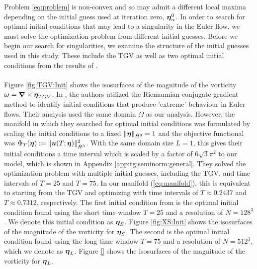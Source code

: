 Problem \ref{eq:problem} is non-convex and so may admit a different local maxima depending on the initial guess used at iteration zero, ${\boldsymbol \eta_\alpha^0}$. In order to search for optimal initial conditions that may lead to a singularity in the Euler flow, we must solve the optimization problem from different initial guesses. Before we begin our search for singularities, we examine the structure of the initial guesses used in this study. These include the TGV as well as two optimal initial conditions from the results of \cite{zhao_systematic_2023}.
\\~\\
Figure \ref{fig:TGV:Init} shows the isosurfaces of the magnitude of the vorticity {\color{red}$\boldsymbol \omega = {\boldsymbol \nabla}\times{\boldsymbol \eta}_{TGV}$. In \cite{zhao_systematic_2023}, the authors utilized the Riemannian conjugate gradient method to identify initial conditions that produce 'extreme' behaviour in Euler flows. Their analysis used the same domain $\Omega$ as our analysis. However, the manifold in which they searched for optimal initial conditions was formulated by scaling the initial conditions to a fixed $\|{\boldsymbol \eta}\|_{\dot{H}^3} = 1$ and the objective functional was $\Phi_T({\boldsymbol \eta}) := \|\boldsymbol u(T;{\boldsymbol \eta})\|_{\dot{H}^3}^2$. With the same domain size $L=1$, this gives their initial conditions a time interval which is scaled by a factor of $6\sqrt{3}\pi^2$ to our model, which is shown in Appendix \ref{app:tg:seminorm:general}. They solved the optimization problem with multiple initial guesses, including the TGV, and time intervals of $T=25$ and $T=75$. In our manifold (\ref{eq:manifold}), this is equivalent to starting from the TGV and optimizing with time intervals of $T\approx 0.2437$ and $T\approx 0.7312$, respectively. The first initial condition from \cite{zhao_systematic_2023} is the optimal initial condition found using the short time window $T=25$ and a resolution of $N=128^3$. We denote this initial condition as ${\boldsymbol \eta}_{S}$. Figure \ref{fig:XS:Init} shows the isosurfaces of the magnitude of the vorticity for ${\boldsymbol \eta}_{S}$. The second is the optimal initial condition found using the long time window $T=75$ and a resolution of $N=512^3$, which we denote as ${\boldsymbol \eta}_{L}$. Figure \ref{} shows the isosurfaces of the magnitude of the vorticity for ${\boldsymbol \eta}_{L}$.
}
